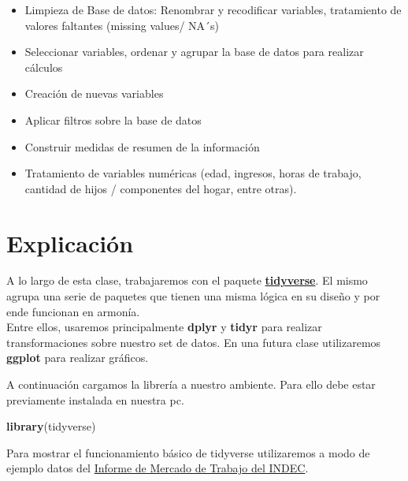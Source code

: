 \documentclass[]{book}
\newenvironment{Shaded}{\begin{snugshade}}{\end{snugshade}}
\newcommand{\KeywordTok}[1]{\textcolor[rgb]{0.13,0.29,0.53}{\textbf{#1}}}
\newcommand{\NormalTok}[1]{#1}
\providecommand{\tightlist}{%
  \setlength{\itemsep}{0pt}\setlength{\parskip}{0pt}}
\begin{document}
\begin{itemize}
\tightlist
\item
  Limpieza de Base de datos: Renombrar y recodificar variables, tratamiento de valores faltantes (missing values/ NA´s)
\item
  Seleccionar variables, ordenar y agrupar la base de datos para realizar cálculos
\item
  Creación de nuevas variables
\item
  Aplicar filtros sobre la base de datos
\item
  Construir medidas de resumen de la información
\item
  Tratamiento de variables numéricas (edad, ingresos, horas de trabajo, cantidad de hijos / componentes del hogar, entre otras).
\end{itemize}

\hypertarget{explicacion-1}{%
\section{Explicación}\label{explicacion-1}}

A lo largo de esta clase, trabajaremos con el paquete \href{https://www.tidyverse.org/}{\textbf{tidyverse}}. El mismo agrupa una serie de paquetes que tienen una misma lógica en su diseño y por ende funcionan en armonía.\\
Entre ellos, usaremos principalmente \textbf{dplyr} y \textbf{tidyr} para realizar transformaciones sobre nuestro set de datos. En una futura clase utilizaremos \textbf{ggplot} para realizar gráficos.

A continuación cargamos la librería a nuestro ambiente. Para ello debe estar previamente instalada en nuestra pc.

\begin{Shaded}
\begin{Highlighting}[]
\KeywordTok{library}\NormalTok{(tidyverse)}
\end{Highlighting}
\end{Shaded}

Para mostrar el funcionamiento básico de tidyverse utilizaremos a modo de ejemplo datos del \href{https://www.indec.gob.ar/uploads/informesdeprensa/mercado_trabajo_eph_1trim19B489ACCDF9.pdf}{Informe de Mercado de Trabajo del INDEC}.
\end{document}
